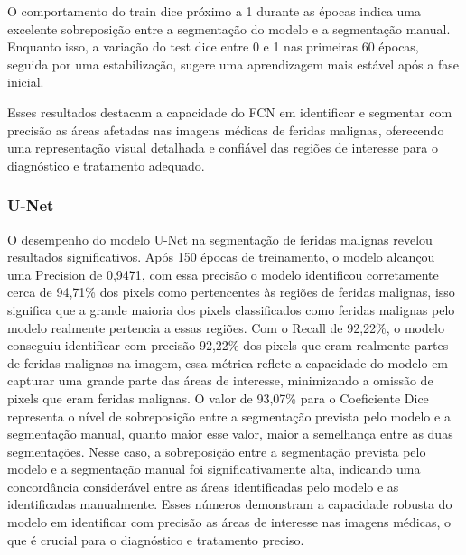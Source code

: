         O comportamento do train dice próximo a 1 durante as épocas indica uma excelente sobreposição entre a segmentação do modelo e a segmentação manual. Enquanto isso, a variação do test dice entre 0 e 1 nas primeiras 60 épocas, seguida por uma estabilização, sugere uma aprendizagem mais estável após a fase inicial.

        Esses resultados destacam a capacidade do \ac{FCN} em identificar e segmentar com precisão as áreas afetadas nas imagens médicas de feridas malignas, oferecendo uma representação visual detalhada e confiável das regiões de interesse para o diagnóstico e tratamento adequado.

          
    \subsubsection{U-Net}

        O desempenho do modelo \ac{U-Net} na segmentação de feridas malignas revelou resultados significativos. Após 150 épocas de treinamento, o modelo alcançou uma Precision de 0,9471, com essa precisão o modelo identificou corretamente cerca de 94,71\% dos pixels como pertencentes às regiões de feridas malignas, isso significa que a grande maioria dos pixels classificados como feridas malignas pelo modelo realmente pertencia a essas regiões. Com o Recall de 92,22\%, o modelo conseguiu identificar com precisão 92,22\% dos pixels que eram realmente partes de feridas malignas na imagem, essa métrica reflete a capacidade do modelo em capturar uma grande parte das áreas de interesse, minimizando a omissão de pixels que eram feridas malignas. O valor de 93,07\% para o Coeficiente Dice representa o nível de sobreposição entre a segmentação prevista pelo modelo e a segmentação manual, quanto maior esse valor, maior a semelhança entre as duas segmentações. Nesse caso, a sobreposição entre a segmentação prevista pelo modelo e a segmentação manual foi significativamente alta, indicando uma concordância considerável entre as áreas identificadas pelo modelo e as identificadas manualmente. Esses números demonstram a capacidade robusta do modelo em identificar com precisão as áreas de interesse nas imagens médicas, o que é crucial para o diagnóstico e tratamento preciso.
        
